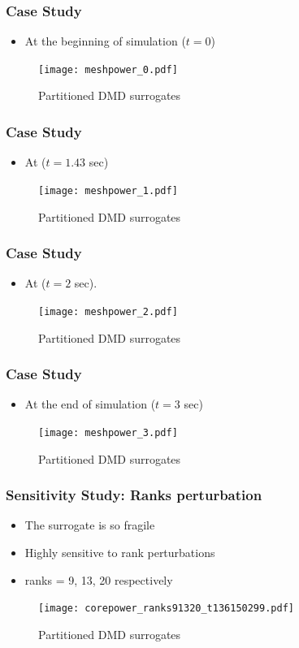 \documentclass[fleqn]{beamer}
\begin{document}
\begin{frame}
\frametitle{Case Study}
\begin{itemize}
	\item At the beginning of simulation ($t=0$)
\end{itemize}
\begin{figure}
\texttt{[image: meshpower\_0.pdf]}
\caption{Partitioned DMD surrogates}
\end{figure}
\end{frame}

\begin{frame}
\frametitle{Case Study}
\begin{itemize}
	\item At ($t=1.43$ sec)
\end{itemize}
\begin{figure}[ht]
\texttt{[image: meshpower\_1.pdf]}
\caption{Partitioned DMD surrogates}
\end{figure}
\end{frame}

\begin{frame}
\frametitle{Case Study}
\begin{itemize}
	\item At ($t=2$ sec).
\end{itemize}
\begin{figure}
\texttt{[image: meshpower\_2.pdf]}
\caption{Partitioned DMD surrogates}
\end{figure}
\end{frame}

\begin{frame}
\frametitle{Case Study}
\begin{itemize}
	\item At the end of simulation ($t=3$ sec)
\end{itemize}
\begin{figure}[ht]
\texttt{[image: meshpower\_3.pdf]}
\caption{Partitioned DMD surrogates}
\end{figure}
\end{frame}

\begin{frame}
\frametitle{Sensitivity Study: Ranks perturbation}
\begin{itemize}
 \item The surrogate is so fragile
 \item Highly sensitive to rank perturbations
 \item ranks = 9, 13, 20 respectively
\end{itemize}

\begin{figure}[ht]

\texttt{[image: corepower\_ranks91320\_t136150299.pdf]}
\caption{Partitioned DMD surrogates}
\end{figure}
\end{frame}
\end{document}
